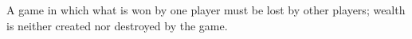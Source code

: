 A game in which what is won by one player must be lost by other
players; wealth is neither created nor destroyed by the game.